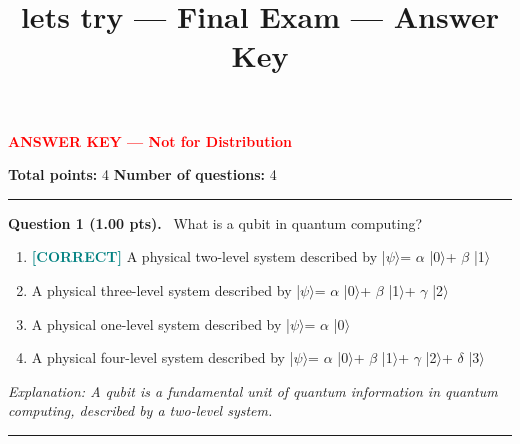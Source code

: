 \documentclass[12pt,a4paper]{article}
\title{lets try --- Final Exam --- Answer Key}
\date{}
\begin{document}
\maketitle

{\large \textbf{\textcolor{red}{ANSWER KEY --- Not for Distribution}}}

\vspace{0.5em}



\noindent
\textbf{Total points:} 4
\hfill
\textbf{Number of questions:} 4

\vspace{1em}
\hrule
\vspace{1.5em}


\noindent
\textbf{Question 1 (1.00 pts).}~
What is a qubit in quantum computing?


\begin{enumerate}[label=\textbf{\Alph*.}]

  \item \textbf{\textcolor{teal}{[CORRECT]}}  A physical two-level system described by |\ensuremath{\psi}\ensuremath{\rangle}= \ensuremath{\alpha} |0\ensuremath{\rangle}+ \ensuremath{\beta} |1\ensuremath{\rangle}

  \item A physical three-level system described by |\ensuremath{\psi}\ensuremath{\rangle}= \ensuremath{\alpha} |0\ensuremath{\rangle}+ \ensuremath{\beta} |1\ensuremath{\rangle}+ \ensuremath{\gamma} |2\ensuremath{\rangle}

  \item A physical one-level system described by |\ensuremath{\psi}\ensuremath{\rangle}= \ensuremath{\alpha} |0\ensuremath{\rangle}

  \item A physical four-level system described by |\ensuremath{\psi}\ensuremath{\rangle}= \ensuremath{\alpha} |0\ensuremath{\rangle}+ \ensuremath{\beta} |1\ensuremath{\rangle}+ \ensuremath{\gamma} |2\ensuremath{\rangle}+ \ensuremath{\delta} |3\ensuremath{\rangle}

\end{enumerate}



\textit{\small Explanation: A qubit is a fundamental unit of quantum information in quantum computing, described by a two-level system.}



\vspace{0.8em}
\noindent\rule{\linewidth}{0.2pt}
\vspace{0.3em}
\end{document}
